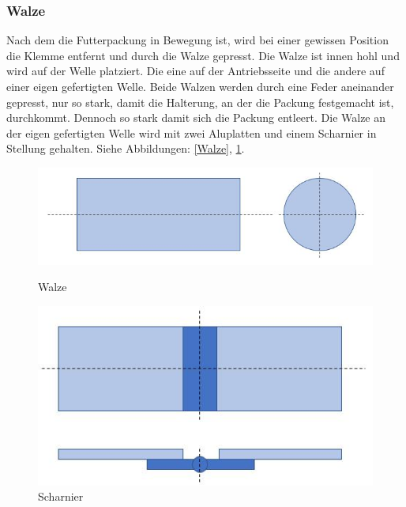 \subsubsection{Walze}

Nach dem die Futterpackung in Bewegung ist, wird bei einer gewissen Position die Klemme entfernt und durch die Walze gepresst. Die Walze ist innen hohl und wird auf der Welle platziert. Die eine auf der Antriebsseite und die andere auf einer eigen gefertigten Welle. Beide Walzen werden durch eine Feder aneinander gepresst, nur so stark, damit die Halterung, an der die Packung festgemacht ist, durchkommt. Dennoch so stark damit sich die Packung entleert. Die Walze an der eigen gefertigten Welle wird mit zwei Aluplatten und einem Scharnier in Stellung gehalten. Siehe Abbildungen: \ref{Walze}, \ref{Scharnier}.

\begin{figure}[H]
   \begin{minipage}[hbt]{.4\linewidth} %
      \includegraphics[width=\linewidth]{Bilder/Powerpoint/Walze}
      \caption{Walze}
      \label{Walze}
   \end{minipage}
   \hspace{.2\linewidth}%
   \begin{minipage}[hbt]{.4\linewidth} %
      \includegraphics[width=\linewidth]{Bilder/Powerpoint/Schanier}
      \caption{Scharnier}
	  \label{Scharnier}      
      \end{minipage}
\end{figure}

